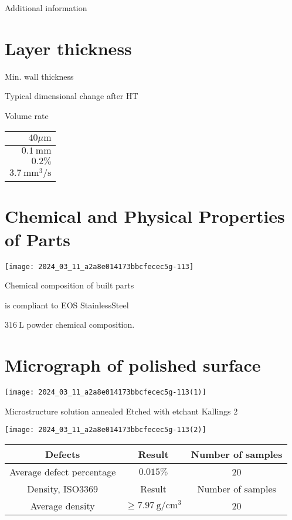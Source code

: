 \documentclass[10pt]{article}
\begin{document}
Additional information

\section*{Layer thickness}
Min. wall thickness

Typical dimensional change after HT

Volume rate

\begin{center}
\begin{tabular}{r}
\hline
$40 \mu \mathrm{m}$ \\
\hline
$0.1 \mathrm{~mm}$ \\
\hline
$0.2 \%$ \\
\hline
$3.7 \mathrm{~mm}^{3} / \mathrm{s}$ \\
\hline
\end{tabular}
\end{center}

\section*{Chemical and Physical Properties of Parts}
\begin{center}
\texttt{[image: 2024\_03\_11\_a2a8e014173bbcfecec5g-113]}
\end{center}

Chemical composition of built parts

is compliant to EOS StainlessSteel

$316 \mathrm{~L}$ powder chemical composition.

\section*{Micrograph of polished surface}
\begin{center}
\texttt{[image: 2024\_03\_11\_a2a8e014173bbcfecec5g-113(1)]}
\end{center}

Microstructure solution annealed Etched with etchant Kallings 2

\begin{center}
\texttt{[image: 2024\_03\_11\_a2a8e014173bbcfecec5g-113(2)]}
\end{center}

\begin{center}
\begin{tabular}{|c|c|c|}
\hline
Defects & Result & Number of samples \\
\hline
Average defect percentage & $0.015 \%$ & 20 \\
\hline
Density, ISO3369 & Result & Number of samples \\
\hline
Average density & $\geq 7.97 \mathrm{~g} / \mathrm{cm}^{3}$ & 20 \\
\hline
\end{tabular}
\end{center}
\end{document}
